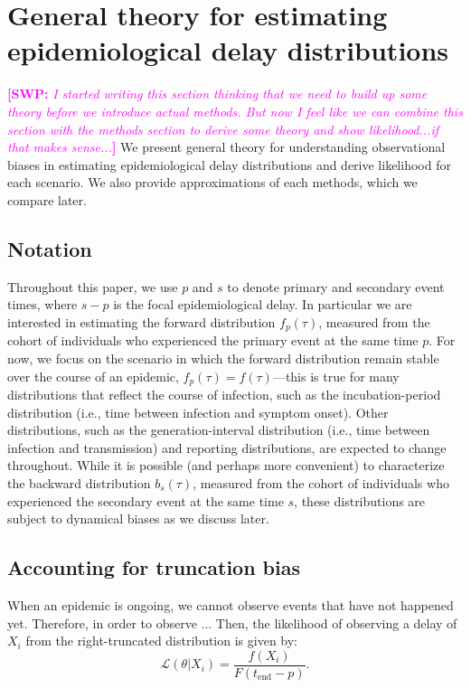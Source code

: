 \documentclass[12pt]{article}
\newcommand{\comment}{\showcomment}
\newcommand{\showcomment}[3]{\textcolor{#1}{\textbf{[#2: }\textsl{#3}\textbf{]}}}
\newcommand{\swp}[1]{\comment{magenta}{SWP}{#1}}
\newcommand{\tend}{{t_{\mathrm{end}}}}
\begin{document}
\section{General theory for estimating epidemiological delay distributions}

\swp{I started writing this section thinking that we need to build up some theory before we introduce actual methods. But now I feel like we can combine this section with the methods section to derive some theory and show likelihood...if that makes sense...}
We present general theory for understanding observational biases in estimating epidemiological delay distributions and derive likelihood for each scenario.
We also provide approximations of each methods, which we compare later.

\subsection{Notation}

Throughout this paper, we use $p$ and $s$ to denote primary and secondary event times, where $s-p$ is the focal epidemiological delay.
In particular we are interested in estimating the forward distribution $f_p(\tau)$, measured from the cohort of individuals who experienced the primary event at the same time $p$.
For now, we focus on the scenario in which the forward distribution remain stable over the course of an epidemic, $f_p(\tau) = f(\tau)$---this is true for many distributions that reflect the course of infection, such as the incubation-period distribution (i.e., time between infection and symptom onset).
Other distributions, such as the generation-interval distribution (i.e., time between infection and transmission) and reporting distributions, are expected to change throughout.
While it is possible (and perhaps more convenient) to characterize the backward distribution $b_s(\tau)$, measured from the cohort of individuals who experienced the secondary event at the same time $s$, these distributions are subject to dynamical biases as we discuss later.

\subsection{Accounting for truncation bias}

When an epidemic is ongoing, we cannot observe events that have not happened yet.
Therefore, in order to observe ...
Then, the likelihood of observing a delay of $X_i$ from the right-truncated distribution is given by:
\begin{equation}
\mathcal L(\theta|X_i) = \frac{f(X_i)}{F(\tend-p)}.
\end{equation}
\end{document}
